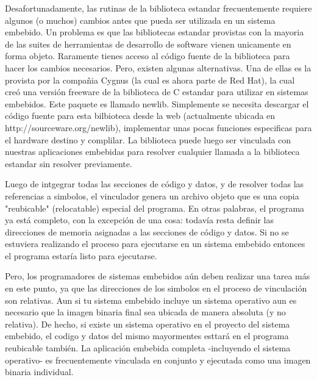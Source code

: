 \documentclass[12pt]{article}
\begin{document}


Desafortunadamente, las rutinas de la biblioteca estandar frecuentemente requiere 
algunos (o muchos) cambios antes que pueda ser utilizada en un sistema embebido.
Un problema es que las bibliotecas estandar provistas con la mayoria de las 
suites de herramientas de desarrollo de software vienen unicamente en forma objeto.
Raramente tienes acceso al código fuente de la biblioteca para hacer los 
cambios necesarios. Pero, existen algunas alternativas. Una de ellas es
la provista por la compañia Cygnus (la cual es ahora parte de Red Hat),
la cual creó una versión freeware de la biblioteca de C estandar para utilizar 
en sistemas embebidos.
Este paquete es llamado newlib. Simplemente se necesita descargar el código fuente
para esta bilbioteca desde la web (actualmente ubicada en http://sourceware.org/newlib),
implementar unas pocas funciones especificas para el hardware destino y complilar.
La biblioteca puede luego ser vinculada con nuestras aplicaciones embebidas
para resolver cualquier llamada a la biblioteca estandar sin resolver previamente.

Luego de intgegrar todas las secciones de código y datos, y de resolver todas
las referencias a simbolos, el vinculador genera un archivo objeto que es
una copia "reubicable" (relocatable) especial del programa. En otras palabras,
el programa ya está completo, con la excepción de una cosa: todavía
resta definir las direcciones de memoria asignadas a las secciones de código y 
datos. Si no se estuviera realizando el proceso para ejecutarse en un 
sistema embebido entonces el programa estaría listo para ejecutarse.

Pero, los programadores de sistemas embebidos aún deben realizar una
tarea más en este punto, ya que 
las direcciones de los simbolos en el proceso de vinculación son relativas.
Aun si tu sistema embebido incluye un sistema operativo aun es necesario
que la imagen binaria final sea ubicada de manera absoluta (y no relativa).
De hecho, si existe un sistema operativo en el proyecto del sistema embebido,
el codigo y datos del mismo mayormentes esttará en el programa reubicable 
también.
La aplicación embebida completa -incluyendo el sistema operativo- es
frecuentemente vinculada en conjunto y ejecutada como una imagen binaria
individual.
\end{document}
